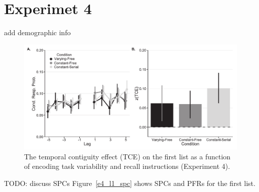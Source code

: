 \documentclass[jou,natbib,floatsintext]{apa6} %
\begin{document}
\color{black}





\section{Experimet 4}
\label{TODO-8} add demographic info









\color{red}



\begin{figure}%
\includegraphics{figures/E4_crp_list1.pdf}
\caption{The temporal contiguity effect (TCE) on the first list as a function of encoding task variability and recall instructions (Experiment 4). \paneltext}
\label{E4_crp_list1}
\end{figure}







TODO: discuss SPCs
Figure~\ref{e4_l1_spc} shows SPCs and PFRs for the first list.
\end{document}
